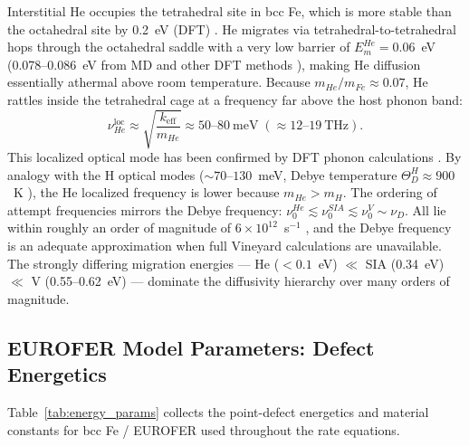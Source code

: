 \documentclass[pdflatex,sn-basic]{sn-jnl} %
\begin{document}
Interstitial He occupies the tetrahedral site in bcc Fe, which is more stable
than the octahedral site by 0.2~eV (DFT) \cite{FuWillaime2005}.
He migrates via tetrahedral-to-tetrahedral hops through the octahedral
saddle with a very low barrier of $E_m^{He} = 0.06$~eV \cite{FuWillaime2005}
(0.078--0.086~eV from MD and other DFT methods
\cite{Morishita2003,Solubility2018}), making He diffusion essentially
athermal above room temperature. Because $m_{He}/m_{Fe} \approx 0.07$, He rattles inside the tetrahedral
cage at a frequency far above the host phonon band:
%
\begin{equation}
  \nu_{He}^{\mathrm{loc}} \approx
  \sqrt{\frac{k_{\mathrm{eff}}}{m_{He}}} \approx 50\text{--}80~\text{meV}
  \;(\approx12\text{--}19~\text{THz}).
\end{equation}
%
This localized optical mode has been confirmed by DFT phonon calculations
\cite{FuWillaime2005,Marinelli2019}.
By analogy with the H optical modes ($\sim\!70$--$130$~meV, Debye
temperature $\Theta_D^H \approx 900$~K \cite{Marinelli2019}),
the He localized frequency is lower because $m_{He} > m_H$. The ordering of attempt frequencies mirrors the Debye frequency:
$\nu_0^{He} \lesssim \nu_0^{SIA} \lesssim \nu_0^V \sim \nu_D$.
All lie within roughly an order of magnitude of $6\times10^{12}$~s$^{-1}$
, and the Debye frequency is an adequate approximation when full Vineyard
calculations are unavailable.
The strongly differing migration energies --- He ($<0.1$~eV) $\ll$
SIA (0.34~eV) $\ll$ V (0.55--0.62~eV) --- dominate the diffusivity
hierarchy over many orders of magnitude.
\subsection{EUROFER Model Parameters: Defect Energetics}
\label{sec:params_energetics}

Table~\ref{tab:energy_params} collects the point-defect energetics and
material constants for bcc Fe / EUROFER used throughout the rate equations.
\end{document}
